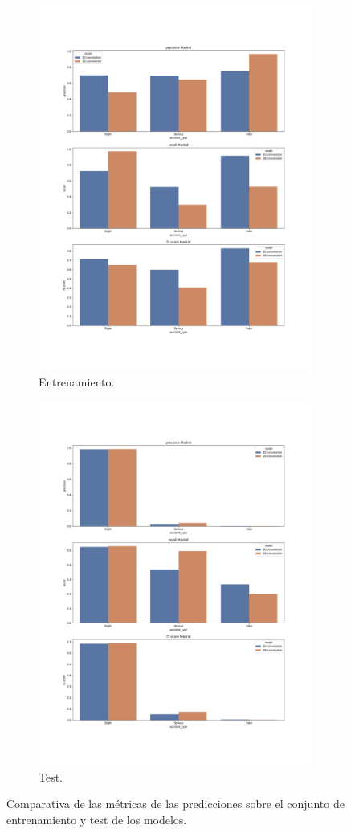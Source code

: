     \begin{figure}[H]
      \begin{subfigure}{0.4\textwidth}        
        \includegraphics[width=9cm]{archivos/5.Resultados/ComparativaCNNTrain}
        \caption{Entrenamiento.}
        \label{ResultsCNNImage:Train}
      \end{subfigure}
      \hspace{10mm}
      \begin{subfigure}{0.4\textwidth}        
        \centering
        \includegraphics[width=9cm]{archivos/5.Resultados/ComparativaCNNTest}
        \caption{Test.}
        \label{ResultsCNNImage:Test}
      \end{subfigure}
      \caption{Comparativa de las métricas de las predicciones sobre el conjunto de entrenamiento y test de los modelos.}
      \label{ResultsCNNImage}
    \end{figure}




